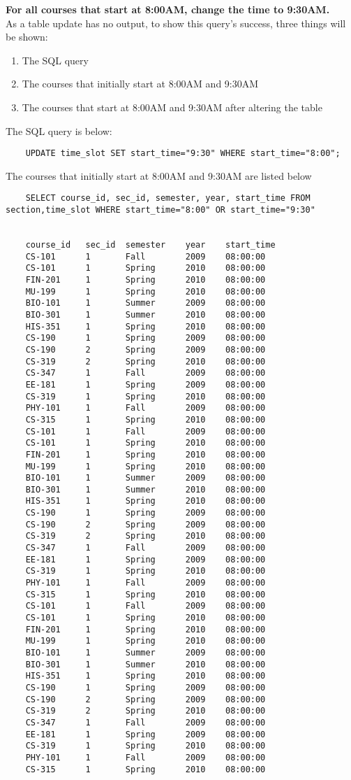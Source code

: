 \documentclass[letterpaper]{article}
\begin{document}
    \textbf{For all courses that start at 8:00AM, change the time to 9:30AM.} \\
    As a table update has no output, to show this query's success, three things will be shown:
    \begin{enumerate}
        \item The SQL query
        \item The courses that initially start at 8:00AM and 9:30AM
        \item The courses that start at 8:00AM and 9:30AM after altering the table
    \end{enumerate}
    The SQL query is below:
    \begin{lstlisting}
    UPDATE time_slot SET start_time="9:30" WHERE start_time="8:00";
    \end{lstlisting}
    The courses that initially start at 8:00AM and 9:30AM are listed below
    \begin{lstlisting}
    SELECT course_id, sec_id, semester, year, start_time FROM section,time_slot WHERE start_time="8:00" OR start_time="9:30"
       
       
    course_id	sec_id	semester	year	start_time	
    CS-101  	1	    Fall	    2009	08:00:00	
    CS-101  	1	    Spring	    2010	08:00:00	
    FIN-201 	1	    Spring	    2010	08:00:00	
    MU-199  	1	    Spring	    2010	08:00:00	
    BIO-101 	1	    Summer	    2009	08:00:00	
    BIO-301 	1	    Summer	    2010	08:00:00	
    HIS-351 	1	    Spring	    2010	08:00:00	
    CS-190  	1	    Spring	    2009	08:00:00	
    CS-190  	2	    Spring	    2009	08:00:00	
    CS-319  	2	    Spring	    2010	08:00:00	
    CS-347  	1	    Fall  	    2009	08:00:00	
    EE-181  	1	    Spring    	2009	08:00:00	
    CS-319  	1	    Spring    	2010	08:00:00	
    PHY-101 	1	    Fall  	    2009	08:00:00	
    CS-315  	1	    Spring    	2010	08:00:00	
    CS-101  	1	    Fall  	    2009	08:00:00	
    CS-101  	1	    Spring    	2010	08:00:00	
    FIN-201 	1	    Spring    	2010	08:00:00	
    MU-199  	1	    Spring    	2010	08:00:00	
    BIO-101 	1	    Summer    	2009	08:00:00	
    BIO-301 	1  	    Summer      2010	08:00:00	
    HIS-351 	1  	    Spring      2010	08:00:00	
    CS-190  	1  	    Spring      2009	08:00:00	
    CS-190  	2  	    Spring      2009	08:00:00	
    CS-319  	2  	    Spring      2010	08:00:00	
    CS-347  	1  	    Fall        2009	08:00:00	
    EE-181  	1  	    Spring      2009	08:00:00	
    CS-319  	1  	    Spring      2010	08:00:00	
    PHY-101 	1  	    Fall        2009	08:00:00	
    CS-315  	1  	    Spring      2010	08:00:00	
    CS-101  	1       Fall    	2009	08:00:00	
    CS-101  	1       Spring  	2010	08:00:00	
    FIN-201 	1       Spring  	2010	08:00:00	
    MU-199  	1       Spring  	2010	08:00:00	
    BIO-101 	1       Summer  	2009	08:00:00	
    BIO-301 	1       Summer  	2010	08:00:00	
    HIS-351 	1       Spring  	2010	08:00:00	
    CS-190  	1       Spring  	2009	08:00:00	
    CS-190  	2       Spring  	2009	08:00:00	
    CS-319  	2       Spring  	2010	08:00:00	
    CS-347  	1      	Fall	    2009	08:00:00	
    EE-181  	1      	Spring	    2009	08:00:00	
    CS-319  	1      	Spring	    2010	08:00:00	
    PHY-101 	1      	Fall	    2009	08:00:00	
    CS-315  	1      	Spring	    2010	08:00:00
    \end{lstlisting}
\end{document}
